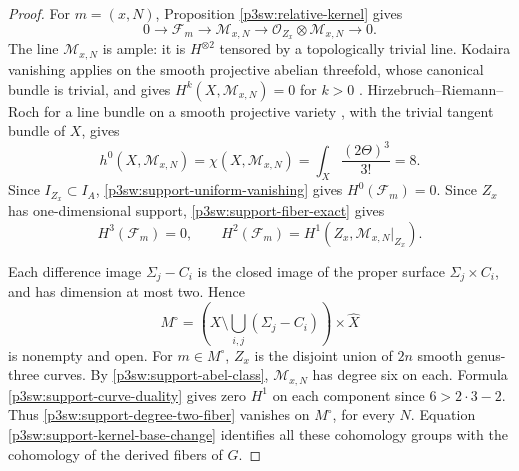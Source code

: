 \documentclass[11pt]{article}
\numberwithin{equation}{section}
\begin{document}
\begin{proof}
For \(m=(x,N)\), Proposition \ref{p3sw:relative-kernel} gives
\begin{equation}
 0\longrightarrow\mathscr F_m\longrightarrow\mathcal M_{x,N}
 \longrightarrow\mathcal O_{Z_x}\otimes\mathcal M_{x,N}
 \longrightarrow0.
 \label{p3sw:support-fiber-exact}
\end{equation}
The line \(\mathcal M_{x,N}\) is ample: it is \(H^{\otimes2}\)
tensored by a topologically trivial line.  Kodaira vanishing applies
on the smooth projective abelian threefold, whose canonical bundle
is trivial, and gives \(H^k(X,\mathcal M_{x,N})=0\) for \(k>0\)
\cite[Theorem 3, p.~1272]{P3SWKodaira1953}.
Hirzebruch--Riemann--Roch for a line bundle on a smooth projective
variety \cite[Main Theorem (M), p.~111]{P3SWHirzebruch1954}, with
the trivial tangent bundle of \(X\), gives
\begin{equation}
 h^0(X,\mathcal M_{x,N})
 =\chi(X,\mathcal M_{x,N})
 =\int_X\frac{(2\Theta)^3}{3!}=8.
 \label{p3sw:support-ambient-euler}
\end{equation}
Since \(I_{Z_x}\subset I_A\), \eqref{p3sw:support-uniform-vanishing} gives \(H^0(\mathscr F_m)=0\).
Since \(Z_x\) has one-dimensional support, \eqref{p3sw:support-fiber-exact} gives
\begin{equation}
 H^3(\mathscr F_m)=0,\qquad
 H^2(\mathscr F_m)=
 H^1(Z_x,\mathcal M_{x,N}|_{Z_x}).
 \label{p3sw:support-degree-two-fiber}
\end{equation}

Each difference image
\(\Sigma_j-C_i\) is the closed image of the proper surface
\(\Sigma_j\times C_i\), and has dimension at most two.  Hence
\begin{equation}
 M^\circ=
 \left(X\setminus\bigcup_{i,j}(\Sigma_j-C_i)\right)\times\widehat X
 \label{p3sw:support-disjoint-open}
\end{equation}
is nonempty and open.  For \(m\in M^\circ\), \(Z_x\) is the disjoint
union of \(2n\) smooth genus-three curves.  By \eqref{p3sw:support-abel-class},
\(\mathcal M_{x,N}\) has degree six on each.  Formula \eqref{p3sw:support-curve-duality} gives
zero \(H^1\) on each component since \(6>2\cdot3-2\).
Thus \eqref{p3sw:support-degree-two-fiber} vanishes on \(M^\circ\), for every \(N\).
Equation \eqref{p3sw:support-kernel-base-change} identifies all these cohomology groups with the
cohomology of the derived fibers of \(G\).


\end{proof}
\end{document}
